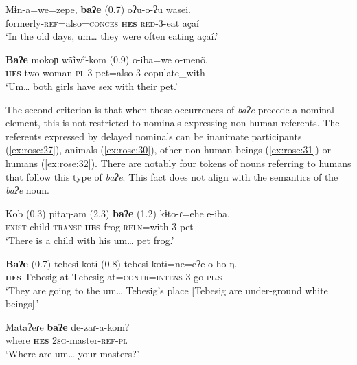 \documentclass[output=paper]{langscibook}
\begin{document}
\ea \label{ex:rose:28}
\gll Mɨn-a=we=zepe,  \textbf{baʔe} (0.7)  oʔu-o-ʔu  wasei.\\
formerly-\textsc{ref=}also\textsc{=conces}  \textbf{\textsc{hes}} {} \textsc{red}{}-3-eat açaí\\
\glt ‘In the old days, um… they were often eating açaí.’ 
\z 


\ea \label{ex:rose:29}
\gll \textbf{Baʔe}  mokoɲ  wãĩwĩ-kom (0.9)   o-iba=we  o-menõ.\\
\textbf{\textsc{hes}}  two  woman-\textsc{pl} {} 3-pet=also  3-copulate\_with\\
\glt \textsc{‘U}m… both girls have sex with their pet.’ 
\z 

The second criterion is that when these occurrences of \textit{baʔe} precede a nominal element, this is not restricted to nominals expressing non-human referents. The referents expressed by delayed nominals can be inanimate participants (\ref{ex:rose:27}), animals (\ref{ex:rose:30}), other non-human beings (\ref{ex:rose:31}) or humans (\ref{ex:rose:32}). There are notably four tokens of nouns referring to humans that follow this type of \textit{baʔe}. This fact does not align with the semantics of the \textit{baʔe} noun.


\ea \label{ex:rose:30}
\gll Kob (0.3) pitaŋ-am (2.3)  \textbf{baʔe} (1.2)  kɨto-ɾ=ehe  e-iba.\\
\textsc{exist} {} child-\textsc{transf} {} \textbf{\textsc{hes}} {} frog-\textsc{reln}=with  3-pet\\
\glt ‘There is a child with his um… pet frog.’ 
\z 

\ea \label{ex:rose:31}
\gll \textbf{Baʔe} (0.7)  tebesi-kotɨ (0.8)  tebesi-kotɨ=ne=eʔe  o-ho-ŋ.\\
\textbf{\textsc{hes}} {} \textsc{T}ebesig-at {} \textsc{T}ebesig-at=\textsc{contr}=\textsc{intens}  3-go-\textsc{pl}.\textsc{s}\\
\glt ‘They are going to the um… Tebesig’s place [Tebesig are under-ground white beings].’ 
\z 


\ea \label{ex:rose:32}
\gll Mataʔeɾe\footnotemark{} \textbf{baʔe}  de-zaɾ-a-kom?\\
where  \textbf{\textsc{hes}}  2\textsc{sg}{}-master-\textsc{ref}{}-\textsc{pl}\\
\glt ‘Where are um… your masters?’ 
\z 
{}  
\end{document}
